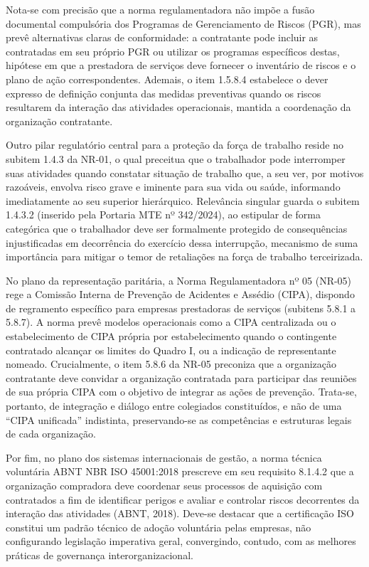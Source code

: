 \documentclass[12pt,a4paper]{article}
\begin{document}
Nota-se com precisão que a norma regulamentadora não impõe a fusão documental compulsória dos Programas de Gerenciamento de Riscos (PGR), mas prevê alternativas claras de conformidade: a contratante pode incluir as contratadas em seu próprio PGR ou utilizar os programas específicos destas, hipótese em que a prestadora de serviços deve fornecer o inventário de riscos e o plano de ação correspondentes. Ademais, o item 1.5.8.4 estabelece o dever expresso de definição conjunta das medidas preventivas quando os riscos resultarem da interação das atividades operacionais, mantida a coordenação da organização contratante.

Outro pilar regulatório central para a proteção da força de trabalho reside no subitem 1.4.3 da NR-01, o qual preceitua que o trabalhador pode interromper suas atividades quando constatar situação de trabalho que, a seu ver, por motivos razoáveis, envolva risco grave e iminente para sua vida ou saúde, informando imediatamente ao seu superior hierárquico. Relevância singular guarda o subitem 1.4.3.2 (inserido pela Portaria MTE nº 342/2024), ao estipular de forma categórica que o trabalhador deve ser formalmente protegido de consequências injustificadas em decorrência do exercício dessa interrupção, mecanismo de suma importância para mitigar o temor de retaliações na força de trabalho terceirizada.

No plano da representação paritária, a Norma Regulamentadora nº 05 (NR-05) rege a Comissão Interna de Prevenção de Acidentes e Assédio (CIPA), dispondo de regramento específico para empresas prestadoras de serviços (subitens 5.8.1 a 5.8.7). A norma prevê modelos operacionais como a CIPA centralizada ou o estabelecimento de CIPA própria por estabelecimento quando o contingente contratado alcançar os limites do Quadro I, ou a indicação de representante nomeado. Crucialmente, o item 5.8.6 da NR-05 preconiza que a organização contratante deve convidar a organização contratada para participar das reuniões de sua própria CIPA com o objetivo de integrar as ações de prevenção. Trata-se, portanto, de integração e diálogo entre colegiados constituídos, e não de uma ``CIPA unificada'' indistinta, preservando-se as competências e estruturas legais de cada organização.

Por fim, no plano dos sistemas internacionais de gestão, a norma técnica voluntária ABNT NBR ISO 45001:2018 prescreve em seu requisito 8.1.4.2 que a organização compradora deve coordenar seus processos de aquisição com contratados a fim de identificar perigos e avaliar e controlar riscos decorrentes da interação das atividades (ABNT, 2018). Deve-se destacar que a certificação ISO constitui um padrão técnico de adoção voluntária pelas empresas, não configurando legislação imperativa geral, convergindo, contudo, com as melhores práticas de governança interorganizacional.
\end{document}
